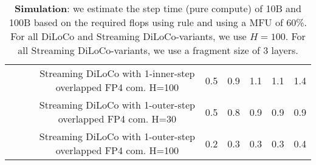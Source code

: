 \begin{table*}[t]
{\begin{tabular}{@{}ccc|c|ccccc@{}}
& & & Streaming DiLoCo with 1-inner-step overlapped FP4 com. H=100 & 0.5 & 0.9 & 1.1 & 1.1 & 1.4 \\
& & & Streaming DiLoCo with 1-outer-step overlapped FP4 com. H=30 & 0.5 & 0.8 & 0.9 & 0.9 & 0.9 \\
& & & Streaming DiLoCo with 1-outer-step overlapped FP4 com. H=100 & 0.2 & 0.3 & 0.3 & 0.3 & 0.4 \\
\bottomrule
\end{tabular}
}
\caption{\textbf{Simulation}: we estimate the step time (pure compute) of 10B and 100B based on the required flops using \cite{kaplan2020scalinglawsneurallanguage} rule and using a MFU of 60\%. For all DiLoCo and Streaming DiLoCo-variants, we use $H=100$. For all Streaming DiLoCo-variants, we use a fragment size of 3 layers.}
\label{tab:simulation}
\end{table*}


